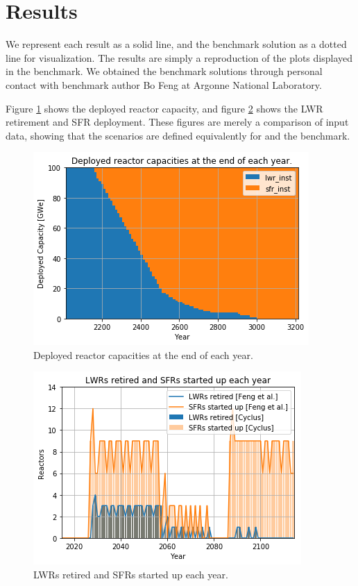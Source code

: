 \section{Results}

We represent each \Cyclus result as a solid line, and the benchmark solution
as a dotted line for visualization. The results are
simply a reproduction of the plots displayed in the benchmark. 
We obtained the benchmark solutions through personal contact with
benchmark author Bo Feng at Argonne National Laboratory.

Figure \ref{fig:pow_plot} shows the deployed reactor capacity, and
figure \ref{fig:dep} shows the \gls{LWR} retirement and \gls{SFR}
deployment. These figures are merely a comparison of
input data, showing that the scenarios are defined equivalently for
\Cyclus and the benchmark. 

\begin{figure}[htbp!]
    \begin{center}
        \includegraphics[scale=0.5]{./images/results_18/power_plot.png}
    \end{center}
        \caption{Deployed reactor capacities at the end of each year.}
    \label{fig:pow_plot}
\end{figure}


\begin{figure}[htbp!]
	\begin{center}
		\includegraphics[scale=0.5]{./images/results_18/dep.png}
	\end{center}
        \caption{\glspl{LWR} retired and \glspl{SFR} started up each year.}
	\label{fig:dep}
\end{figure}

